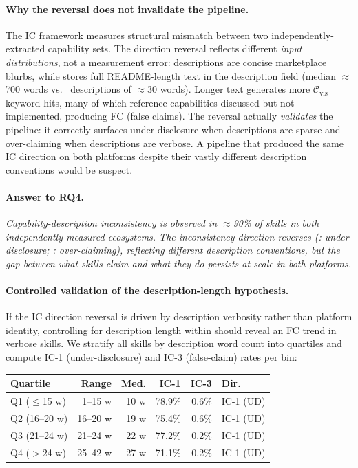 \paragraph{Why the reversal does not invalidate the pipeline.}
The IC framework measures structural mismatch between
two independently-extracted capability sets.
The direction reversal reflects different \emph{input distributions},
not a measurement error:
\clawhub{} descriptions are concise marketplace blurbs,
while \skillssh{} stores full README-length text in the
description field (median $\approx$700 words vs.\
\clawhub{} descriptions of $\approx$30 words).
Longer text generates more $\mathcal{C}_{\text{vis}}$
keyword hits, many of which reference capabilities
discussed but not implemented, producing FC (false claims).
The reversal actually \emph{validates} the pipeline:
it correctly surfaces under-disclosure when descriptions are sparse
and over-claiming when descriptions are verbose.
A pipeline that produced the same IC direction on both
platforms despite their vastly different description conventions
would be suspect.

\paragraph{Answer to RQ4.}
\textit{
  Capability-description inconsistency is observed in $\approx$90\% of skills
  in both independently-measured ecosystems.
  The inconsistency direction reverses
  (\clawhub{}: under-disclosure; \skillssh{}: over-claiming),
  reflecting different description conventions, but the
  gap between what skills claim and what they do
  persists at scale in both platforms.
}

\paragraph{Controlled validation of the description-length hypothesis.}
If the IC direction reversal is driven by description verbosity rather than
platform identity, controlling for description length within \clawhub{}
should reveal an FC trend in verbose skills.
We stratify all \NskillsCH{} skills by description word count into quartiles
and compute IC-1 (under-disclosure) and IC-3 (false-claim) rates per bin:

\begin{center}\small
\begin{tabular}{@{}lrrrrl@{}}
\toprule
\textbf{Quartile} & \textbf{Range} & \textbf{Med.} & \textbf{IC-1} & \textbf{IC-3} & \textbf{Dir.} \\
\midrule
Q1 ($\leq$15 w)  & 1--15 w & 10 w & 78.9\% & 0.6\% & IC-1 (UD) \\
Q2 (16--20 w)    & 16--20 w & 19 w & 75.4\% & 0.6\% & IC-1 (UD) \\
Q3 (21--24 w)    & 21--24 w & 22 w & 77.2\% & 0.2\% & IC-1 (UD) \\
Q4 ($>$24 w)     & 25--42 w & 27 w & 71.1\% & 0.2\% & IC-1 (UD) \\
\bottomrule
\end{tabular}
\end{center}

